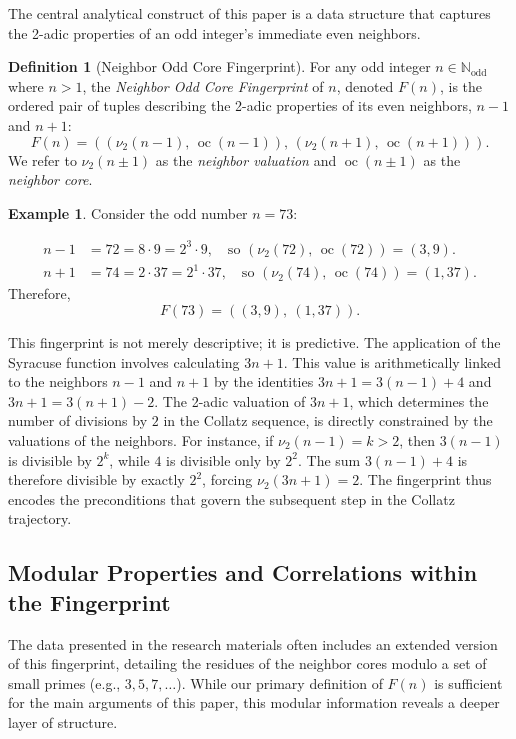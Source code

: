 \documentclass[12pt]{article}
\theoremstyle{plain}
\theoremstyle{definition}
\newtheorem{definition}[theorem]{Definition}
\newtheorem{example}[theorem]{Example}
\begin{document}
The central analytical construct of this paper is a data structure that captures the 2-adic properties of an odd integer's immediate even neighbors.

\begin{definition}[Neighbor Odd Core Fingerprint]
For any odd integer $n \in \mathbb{N}_{\text{odd}}$ where $n > 1$, the \emph{Neighbor Odd Core Fingerprint} of $n$, denoted $F(n)$, is the ordered pair of tuples describing the 2-adic properties of its even neighbors, $n-1$ and $n+1$:
\[
F(n) = \left( \left( \nu_2(n-1),\, \operatorname{oc}(n-1) \right),\, \left( \nu_2(n+1),\, \operatorname{oc}(n+1) \right) \right).
\]
We refer to $\nu_2(n \pm 1)$ as the \emph{neighbor valuation} and $\operatorname{oc}(n \pm 1)$ as the \emph{neighbor core}.
\end{definition}

\begin{example}
Consider the odd number $n = 73$:

\begin{align*}
n-1 &= 72 = 8 \cdot 9 = 2^3 \cdot 9, \quad \text{so } (\nu_2(72),\, \operatorname{oc}(72)) = (3, 9). \\
n+1 &= 74 = 2 \cdot 37 = 2^1 \cdot 37, \quad \text{so } (\nu_2(74),\, \operatorname{oc}(74)) = (1, 37).
\end{align*}
Therefore,
\[
F(73) = ((3, 9),\ (1, 37)).
\]
\end{example}

This fingerprint is not merely descriptive; it is predictive. The application of the Syracuse function involves calculating $3n + 1$. This value is arithmetically linked to the neighbors $n-1$ and $n+1$ by the identities $3n+1 = 3(n-1) + 4$ and $3n+1 = 3(n+1) - 2$. The 2-adic valuation of $3n + 1$, which determines the number of divisions by $2$ in the Collatz sequence, is directly constrained by the valuations of the neighbors. For instance, if $\nu_2(n-1) = k > 2$, then $3(n-1)$ is divisible by $2^k$, while $4$ is divisible only by $2^2$. The sum $3(n-1) + 4$ is therefore divisible by exactly $2^2$, forcing $\nu_2(3n+1) = 2$. The fingerprint thus encodes the preconditions that govern the subsequent step in the Collatz trajectory.

\subsection{Modular Properties and Correlations within the Fingerprint}

The data presented in the research materials often includes an extended version of this fingerprint, detailing the residues of the neighbor cores modulo a set of small primes (e.g., $3, 5, 7, \ldots$). While our primary definition of $F(n)$ is sufficient for the main arguments of this paper, this modular information reveals a deeper layer of structure.
\end{document}
